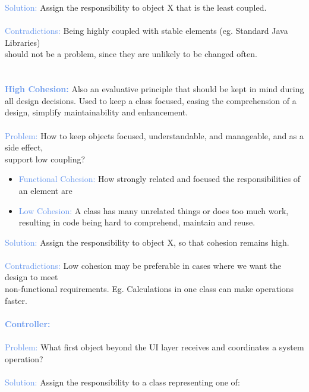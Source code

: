 \documentclass[a4paper,10pt]{article}
\begin{document}
\indent \indent \textcolor{CornflowerBlue}{Solution:} Assign the responsibility to object X that is the least coupled. \\\\
\indent \textcolor{CornflowerBlue}{Contradictions:} Being highly coupled with stable elements (eg. Standard Java Libraries) \\
\indent should not be a problem, since they are unlikely to be changed often. \\\\
\\
\textcolor{CornflowerBlue}{\textbf{High Cohesion:}} Also an evaluative principle that should be kept in mind during all design decisions. Used to keep a class focused, easing the comprehension of a design, simplify maintainability and enhancement.\\\\
\indent \textcolor{CornflowerBlue}{Problem:} How to keep objects focused, understandable, and manageable, and as a side effect, \\
\indent support low coupling? 
\renewcommand{\labelitemi}{\textperiodcentered}
\begin{itemize}
\item \textcolor{CornflowerBlue}{Functional Cohesion:} How strongly related and focused the responsibilities of an element are
\item \textcolor{CornflowerBlue}{Low Cohesion:} A class has many unrelated things or does too much work, resulting in code being hard to comprehend, maintain and reuse. 
\end{itemize}
\indent \indent \textcolor{CornflowerBlue}{Solution:} Assign the responsibility to object X, so that cohesion remains high. \\\\
\indent \textcolor{CornflowerBlue}{Contradictions:} Low cohesion may be preferable in cases where we want the design to meet\\ \indent non-functional requirements. Eg. Calculations in one class can make operations faster. \\\\
\textcolor{CornflowerBlue}{\textbf{Controller:}} \\\\
\indent \textcolor{CornflowerBlue}{Problem:} What first object beyond the UI layer receives and coordinates a system operation?\\\\
\indent \textcolor{CornflowerBlue}{Solution:} Assign the responsibility to a class representing one of:
\end{document}
